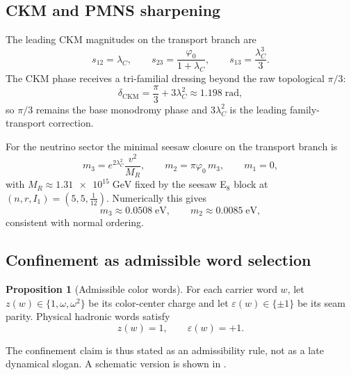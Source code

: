 \documentclass[11pt,a4paper]{article}
\theoremstyle{definition}
\newtheorem{proposition}[theorem]{Proposition}
\theoremstyle{remark}
\newcommand{\phiz}{\varphi_0}
\begin{document}
\subsection{CKM and PMNS sharpening}

The leading CKM magnitudes on the transport branch are
\begin{equation}
\label{eq:ckm-magnitudes}
s_{12}=\lambda_C,
\qquad
s_{23}=\frac{\phiz}{1+\lambda_C},
\qquad
s_{13}=\frac{\lambda_C^3}{3}.
\end{equation}
The CKM phase receives a tri-familial dressing beyond the raw topological $\pi/3$:
\begin{equation}
\label{eq:ckm-phase}
\delta_{\mathrm{CKM}}=\frac{\pi}{3}+3\lambda_C^2\approx\num{1.198}\;\mathrm{rad},
\end{equation}
so $\pi/3$ remains the base monodromy phase and $3\lambda_C^2$ is the leading family-transport correction.

For the neutrino sector the minimal seesaw closure on the transport branch is
\begin{equation}
\label{eq:neutrino-masses}
m_3=e^{2\lambda_C^2}\frac{v^2}{M_R},
\qquad
m_2=\pi\phiz\,m_3,
\qquad
m_1=0,
\end{equation}
with $M_R\approx\num{1.31e15}\;\mathrm{GeV}$ fixed by the seesaw E$_8$ block at $(n,r,I_1)=(5,5,\frac{1}{12})$. Numerically this gives
\[
m_3\approx\num{0.0508}\;\mathrm{eV},
\qquad
m_2\approx\num{0.0085}\;\mathrm{eV},
\]
consistent with normal ordering.

\subsection{Confinement as admissible word selection}

\begin{proposition}[Admissible color words]
For each carrier word $w$, let $z(w)\in\{1,\omega,\omega^2\}$ be its color-center charge and let $\varepsilon(w)\in\{\pm1\}$ be its seam parity. Physical hadronic words satisfy
\[
z(w)=1,
\qquad
\varepsilon(w)=+1.
\]
\end{proposition}

The confinement claim is thus stated as an admissibility rule, not as a late dynamical slogan. A schematic version is shown in .
\end{document}
